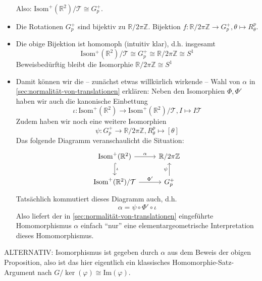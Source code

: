 \documentclass[a4paper, ngerman]{article}
\numberwithin{equation}{chapter}
\theoremstyle{plain}
\theoremstyle{definition}
\newcommand{\geradisometr}{\ensuremath{\mathrm{Isom}^+(\mathbb R^2)}}
\newcommand{\anm}[1]{{\color{red} #1}}
\begin{document}
\begin{itemize}
    Also: \(\geradisometr/\mathcal T \cong G_p^+\). 
    
    \item Die Rotationen \(G_p^+\) sind bijektiv zu \(\mathbb R/2\pi\mathbb Z\). Bijektion \(f: \mathbb R/2\pi\mathbb Z \to G_p^+, \theta \mapsto R_\theta^p\). 
    
    \item Die obige Bijektion ist homomoph (intuitiv klar), d.h. insgesamt
    \begin{equation*}
        \mathrm{Isom^+(\mathbb R^2)}/\mathcal T \cong G_p^+ \cong \mathbb R/2\pi\mathbb Z \cong S^1 
    \end{equation*}
    \anm{Beweisbedürftig bleibt die Isomorphie \(\mathbb R/2\pi\mathbb Z \cong S^1\)}

    \item Damit können wir die -- zunächst etwas willkürlich wirkende -- Wahl von \(\alpha\) in \cref{sec:normalität-von-translationen} erklären: Neben den Isomorphien \(\Phi, \Phi'\) haben wir auch die kanonische Einbettung 
    \begin{equation*}
        \iota: \mathrm{Isom}^+(\mathbb R^2) \to \mathrm{Isom}^+(\mathbb R^2)/\mathcal T, I \mapsto I \mathcal T
    \end{equation*}
    Zudem haben wir noch eine weitere Isomorphien
    \begin{equation*}
        \psi: G_p^+ \to \mathbb R/2\pi\mathbb Z, R_\theta^p \mapsto [\theta]
    \end{equation*}
    Das folgende Diagramm veranschaulicht die Situation: 
    \begin{equation*}
        \begin{tikzcd}
            \geradisometr \arrow[hook]{d}{\iota} \arrow{r}{\alpha} & \mathbb R/2\pi\mathbb Z \\
            \geradisometr/\mathcal T \arrow{r}{\Phi'} & G_p^+ \arrow{u}{\psi}
        \end{tikzcd}
    \end{equation*}
    Tatsächlich kommutiert dieses Diagramm auch, d.h. 
    \begin{equation*}
        \alpha = \psi\circ \Phi'\circ \iota
    \end{equation*}
    Also liefert der in \cref{sec:normalität-von-translationen} eingeführte Homomorphismus \(\alpha\) einfach "`nur"' eine elementargeometrische Interpretation dieses Homomorphismus. 
\end{itemize}
ALTERNATIV: Isomorphismus ist gegeben durch \(\alpha\) aus dem Beweis der obigen Proposition, also ist das hier eigentlich ein klassisches Homomorphie-Satz-Argument nach \(G/\ker(\varphi) \cong \mathrm{Im}(\varphi)\).
\end{document}
